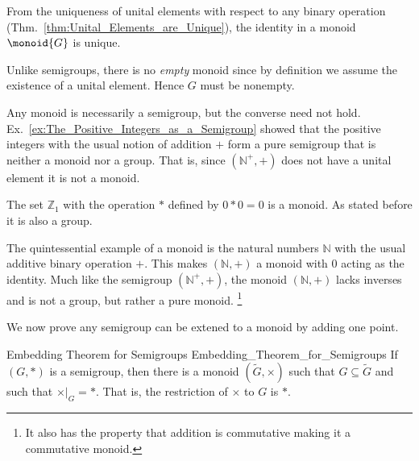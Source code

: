         From the uniqueness of unital elements with respect to any binary
        operation (Thm.~\ref{thm:Unital_Elements_are_Unique}), the identity in a
        monoid $\monoid{G}$ is unique.
        \begin{example}
            Unlike semigroups, there is no \textit{empty} monoid since by
            definition we assume the existence of a unital element. Hence $G$
            must be nonempty.
        \end{example}
        \begin{example}
            Any monoid is necessarily a semigroup, but the converse need not
            hold. Ex.~\ref{ex:The_Positive_Integers_as_a_Semigroup} showed
            that the positive integers with the usual notion of addition $+$
            form a pure semigroup that is neither a monoid nor a group. That is,
            since $(\mathbb{N}^{+},+)$ does not have a unital element it is not
            a monoid.
        \end{example}
        \begin{example}
            The set $\mathbb{Z}_{1}$ with the operation $*$ defined by $0*0=0$
            is a monoid. As stated before it is also a group.
        \end{example}
        \begin{example}
            The quintessential example of a monoid is the natural numbers
            $\mathbb{N}$ with the usual additive binary operation $+$. This
            makes $(\mathbb{N},+)$ a monoid with 0 acting as the identity. Much
            like the semigroup $(\mathbb{N}^{+},+)$, the monoid $(\mathbb{N},+)$
            lacks inverses and is not a group, but rather a pure monoid.%
            \footnote{%
                It also has the property that addition is commutative making it
                a \gls{commutative monoid}.
            }
        \end{example}
        We now prove any semigroup can be extened to a monoid by adding one
        point.
        \begin{ltheorem}{Embedding Theorem for Semigroups}
                        {Embedding_Theorem_for_Semigroups}
            If $(G,*)$ is a semigroup, then there is a monoid
            $(\tilde{G},\times)$ such that $G\subseteq\tilde{G}$ and such that
            $\times|_{G}=*$. That is, the restriction of $\times$ to $G$ is $*$.
        \end{ltheorem}

